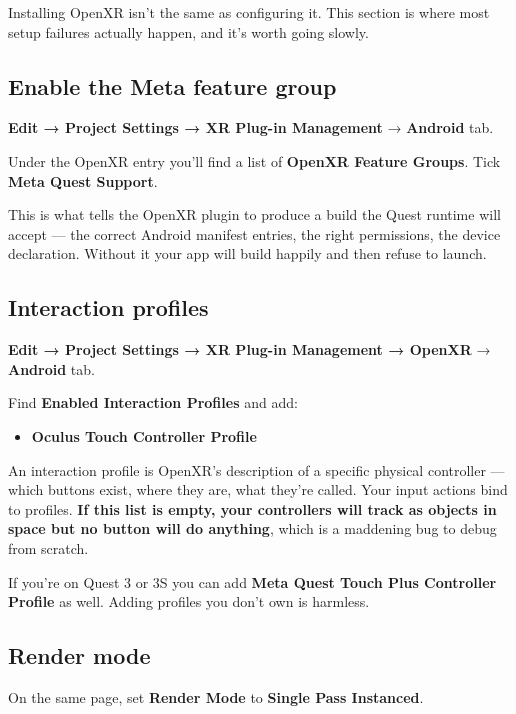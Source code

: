 \documentclass[11pt,a4paper]{article}
\providecommand{\tightlist}{\setlength{\itemsep}{2pt}\setlength{\parskip}{0pt}}
\begin{document}
Installing OpenXR isn't the same as configuring it. This section is where most setup
failures actually happen, and it's worth going slowly.

\subsection{Enable the Meta feature group}\label{enable-the-meta-feature-group}

\textbf{Edit → Project Settings → XR Plug-in Management} → \textbf{Android} tab.

Under the OpenXR entry you'll find a list of \textbf{OpenXR Feature Groups}. Tick \textbf{Meta Quest
Support}.

This is what tells the OpenXR plugin to produce a build the Quest runtime will accept ---
the correct Android manifest entries, the right permissions, the device declaration.
Without it your app will build happily and then refuse to launch.

\subsection{Interaction profiles}\label{interaction-profiles}

\textbf{Edit → Project Settings → XR Plug-in Management → OpenXR} → \textbf{Android} tab.

Find \textbf{Enabled Interaction Profiles} and add:

\begin{itemize}
\tightlist
\item
  \textbf{Oculus Touch Controller Profile}
\end{itemize}

An interaction profile is OpenXR's description of a specific physical controller --- which
buttons exist, where they are, what they're called. Your input actions bind to profiles.
\textbf{If this list is empty, your controllers will track as objects in space but no button
will do anything}, which is a maddening bug to debug from scratch.

If you're on Quest 3 or 3S you can add \textbf{Meta Quest Touch Plus Controller Profile} as
well. Adding profiles you don't own is harmless.

\subsection{Render mode}\label{render-mode}

On the same page, set \textbf{Render Mode} to \textbf{Single Pass Instanced}.
\end{document}
